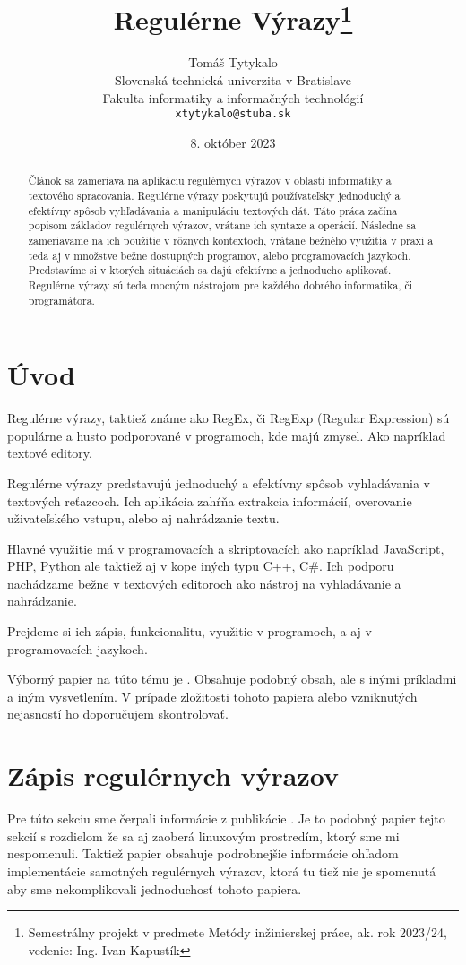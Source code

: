 \documentclass[10pt,twoside,slovak,a4paper]{article}
\title{Regulérne Výrazy\thanks{Semestrálny projekt v predmete Metódy inžinierskej práce, ak. rok 2023/24, vedenie: Ing. Ivan Kapustík}} %
\author{Tomáš Tytykalo\\[2pt]
	{\small Slovenská technická univerzita v Bratislave}\\
	{\small Fakulta informatiky a informačných technológií}\\
	{\small \texttt{xtytykalo@stuba.sk}}
	}
\date{\small 8. október 2023} %
\begin{document}
\maketitle

\begin{abstract}

Článok sa zameriava na aplikáciu regulérnych výrazov v oblasti informatiky a textového spracovania. Regulérne výrazy poskytujú používateľsky jednoduchý a efektívny spôsob vyhľadávania a manipuláciu textových dát.
Táto práca začína popisom základov regulérnych výrazov, vrátane ich syntaxe a operácií. Následne sa zameriavame na ich použitie v rôznych kontextoch, vrátane bežného využitia v praxi a teda aj v množstve bežne dostupných programov, alebo programovacích jazykoch.
Predstavíme si v ktorých situáciách sa dajú efektívne a jednoducho aplikovať. Regulérne výrazy sú teda mocným nástrojom pre každého dobrého informatika, či programátora.

\end{abstract}

\clearpage
\tableofcontents
\clearpage

\section{Úvod}
Regulérne výrazy, taktiež známe ako RegEx, či RegExp (Regular Expression) sú populárne a husto podporované v programoch, kde majú zmysel. Ako napríklad textové editory.

Regulérne výrazy predstavujú jednoduchý a efektívny spôsob vyhladávania v textových reťazcoch. Ich aplikácia zahŕňa extrakcia informácií, overovanie uživateľského vstupu, alebo aj nahrádzanie textu. 

Hlavné využitie má v programovacích a skriptovacích ako napríklad JavaScript, PHP, Python ale taktiež aj v kope iných typu C++, C\#. Ich podporu nachádzame bežne v textových editoroch ako nástroj na vyhladávanie a nahrádzanie.

Prejdeme si ich zápis, funkcionalitu, využitie v programoch, a aj v programovacích jazykoch.

Výborný papier na túto tému je \cite{Sanjiv}. Obsahuje podobný obsah, ale s inými príkladmi a iným vysvetlením. V prípade zložitosti tohoto papiera alebo vzniknutých nejasností ho doporučujem skontrolovať.

\section{Zápis regulérnych výrazov}
Pre túto sekciu sme čerpali informácie z publikácie \cite{RegEx_Basics}. Je to podobný papier tejto sekcií s rozdielom že sa aj zaoberá linuxovým prostredím, ktorý sme mi nespomenuli.
Taktiež papier \cite{RegEx_Usage} obsahuje podrobnejšie informácie ohľadom implementácie samotných regulérnych výrazov, ktorá tu tiež nie je spomenutá aby sme nekomplikovali jednoduchosť tohoto papiera.
\end{document}
